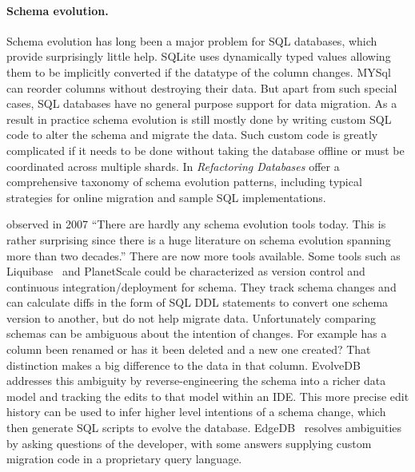 \documentclass[english,submission]{programming}
\begin{document}
\paragraph{Schema evolution.}
Schema evolution has long been a major problem for SQL databases, which provide surprisingly little help.
SQLite \cite{sqliteDatatypes} uses dynamically typed values allowing them to be implicitly converted if the datatype of the column changes.
MYSql \cite{mysqlAlterTable} can reorder columns without destroying their data. But apart from such special cases, SQL databases have no general purpose support for data migration. As a result in practice schema evolution is still mostly done by writing custom SQL code to alter the schema and migrate the data. Such custom code is greatly complicated if it needs to be done without taking the database offline or must be coordinated across multiple shards.
In \emph{Refactoring Databases} \citet{ambler06} offer a comprehensive taxonomy of schema evolution patterns, including typical strategies for online migration and sample SQL implementations.

\citet{bernstein07} observed in 2007 ``There are hardly any schema evolution tools today. This is rather surprising since there is a huge literature on schema evolution spanning more than two decades.'' There are now more tools available. Some tools such as Liquibase~\cite{liquibase} and PlanetScale\cite{planetscale} could be characterized as version control and continuous integration/deployment for schema. They track schema changes and can calculate diffs in the form of SQL DDL statements to convert one schema version to another, but do not help migrate data. Unfortunately comparing schemas can be ambiguous about the intention of changes. For example has a column been renamed or has it been deleted and a new one created? That distinction makes a big difference to the data in that column. EvolveDB\cite{evolvedb} addresses this ambiguity by reverse-engineering the schema into a richer data model and tracking the edits to that model within an IDE. This more precise edit history can be used to infer higher level intentions of a schema change, which then generate SQL scripts to evolve the database. EdgeDB~\cite{edgedb} resolves ambiguities by asking questions of the developer, with some answers supplying custom migration code in a proprietary query language.
\end{document}
